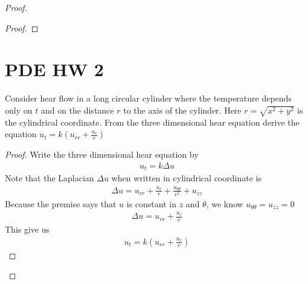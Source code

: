 \documentclass{report}
\begin{document}
\begin{proof}
\begin{proof}
\end{proof}
\section{PDE HW 2}
\begin{question}{}{}
Consider hear flow in a long circular cylinder where the temperature depends only on $t$ and on the distance $r$ to the axis of the cylinder. Here $r=\sqrt{x^2+y^2}$ is the cylindrical coordinate. From the three dimensional hear equation derive the equation $u_t=k (u_{rr}+\frac{u_r}{r})$
\end{question}
\begin{proof}
Write the three dimensional hear equation by 
\begin{align*}
u_t= k \Delta u
\end{align*}
Note that the Laplacian $\Delta u$ when written in cylindrical coordinate is 
\begin{align*}
\Delta u= u_{rr} + \frac{u_r}{r} +\frac{u_{\theta \theta}}{r^2} + u_{zz}
\end{align*}
Because the premise says that $u$ is constant in $z$ and  $\theta$, we know $u_{\theta \theta}=u_{zz}=0$
\begin{align*}
\Delta u = u_{rr}+ \frac{u_r}{r}
\end{align*}
This give us 
\begin{align*}
u_t= k (u_{rr}+ \frac{u_r}{r})
\end{align*}
\end{proof}

\end{proof}
\end{document}
